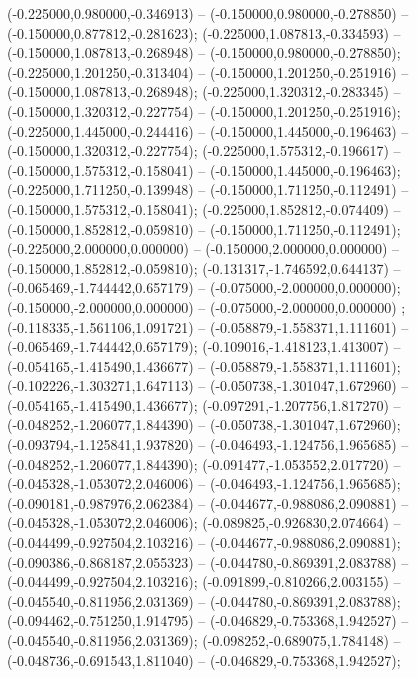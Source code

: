 (-0.225000,0.980000,-0.346913) -- (-0.150000,0.980000,-0.278850) -- (-0.150000,0.877812,-0.281623);
 (-0.225000,1.087813,-0.334593) -- (-0.150000,1.087813,-0.268948) -- (-0.150000,0.980000,-0.278850);
 (-0.225000,1.201250,-0.313404) -- (-0.150000,1.201250,-0.251916) -- (-0.150000,1.087813,-0.268948);
 (-0.225000,1.320312,-0.283345) -- (-0.150000,1.320312,-0.227754) -- (-0.150000,1.201250,-0.251916);
 (-0.225000,1.445000,-0.244416) -- (-0.150000,1.445000,-0.196463) -- (-0.150000,1.320312,-0.227754);
 (-0.225000,1.575312,-0.196617) -- (-0.150000,1.575312,-0.158041) -- (-0.150000,1.445000,-0.196463);
 (-0.225000,1.711250,-0.139948) -- (-0.150000,1.711250,-0.112491) -- (-0.150000,1.575312,-0.158041);
 (-0.225000,1.852812,-0.074409) -- (-0.150000,1.852812,-0.059810) -- (-0.150000,1.711250,-0.112491);
 (-0.225000,2.000000,0.000000) -- (-0.150000,2.000000,0.000000) -- (-0.150000,1.852812,-0.059810);
 (-0.131317,-1.746592,0.644137) -- (-0.065469,-1.744442,0.657179) -- (-0.075000,-2.000000,0.000000);
 (-0.150000,-2.000000,0.000000) -- (-0.075000,-2.000000,0.000000) ;
 (-0.118335,-1.561106,1.091721) -- (-0.058879,-1.558371,1.111601) -- (-0.065469,-1.744442,0.657179);
 (-0.109016,-1.418123,1.413007) -- (-0.054165,-1.415490,1.436677) -- (-0.058879,-1.558371,1.111601);
 (-0.102226,-1.303271,1.647113) -- (-0.050738,-1.301047,1.672960) -- (-0.054165,-1.415490,1.436677);
 (-0.097291,-1.207756,1.817270) -- (-0.048252,-1.206077,1.844390) -- (-0.050738,-1.301047,1.672960);
 (-0.093794,-1.125841,1.937820) -- (-0.046493,-1.124756,1.965685) -- (-0.048252,-1.206077,1.844390);
 (-0.091477,-1.053552,2.017720) -- (-0.045328,-1.053072,2.046006) -- (-0.046493,-1.124756,1.965685);
 (-0.090181,-0.987976,2.062384) -- (-0.044677,-0.988086,2.090881) -- (-0.045328,-1.053072,2.046006);
 (-0.089825,-0.926830,2.074664) -- (-0.044499,-0.927504,2.103216) -- (-0.044677,-0.988086,2.090881);
 (-0.090386,-0.868187,2.055323) -- (-0.044780,-0.869391,2.083788) -- (-0.044499,-0.927504,2.103216);
 (-0.091899,-0.810266,2.003155) -- (-0.045540,-0.811956,2.031369) -- (-0.044780,-0.869391,2.083788);
 (-0.094462,-0.751250,1.914795) -- (-0.046829,-0.753368,1.942527) -- (-0.045540,-0.811956,2.031369);
 (-0.098252,-0.689075,1.784148) -- (-0.048736,-0.691543,1.811040) -- (-0.046829,-0.753368,1.942527);
